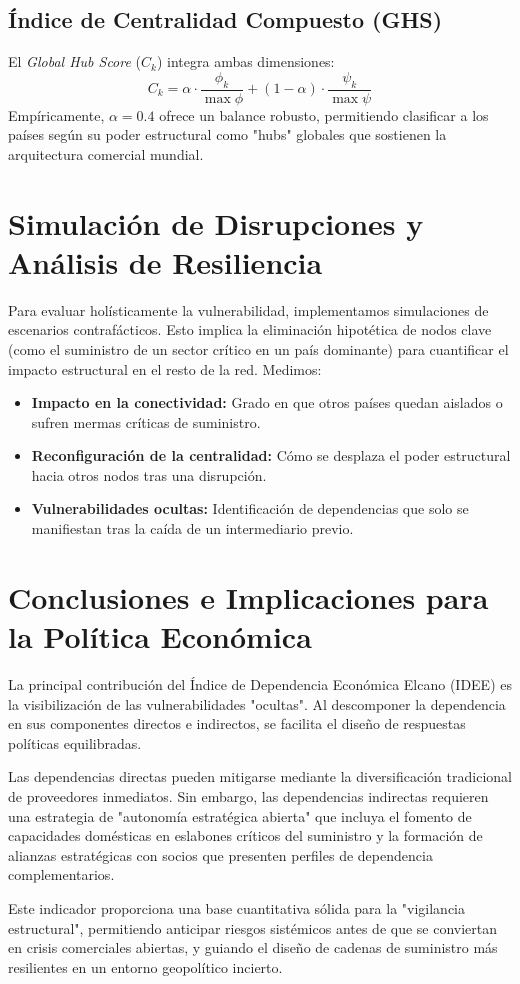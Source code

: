 \documentclass[final,1p,times,authoryear]{elsarticle}
\begin{document}
\subsection{Índice de Centralidad Compuesto (GHS)}
El \textit{Global Hub Score} ($C_k$) integra ambas dimensiones:
\begin{equation}
C_k = \alpha \cdot \frac{\phi_k}{\max \phi} + (1-\alpha) \cdot \frac{\psi_k}{\max \psi}
\end{equation}
Empíricamente, $\alpha = 0.4$ ofrece un balance robusto, permitiendo clasificar a los países según su poder estructural como "hubs" globales que sostienen la arquitectura comercial mundial.

\section{Simulación de Disrupciones y Análisis de Resiliencia}



Para evaluar holísticamente la vulnerabilidad, implementamos simulaciones de escenarios contrafácticos. Esto implica la eliminación hipotética de nodos clave (como el suministro de un sector crítico en un país dominante) para cuantificar el impacto estructural en el resto de la red. Medimos:
\begin{itemize}
    \item \textbf{Impacto en la conectividad:} Grado en que otros países quedan aislados o sufren mermas críticas de suministro.
    \item \textbf{Reconfiguración de la centralidad:} Cómo se desplaza el poder estructural hacia otros nodos tras una disrupción.
    \item \textbf{Vulnerabilidades ocultas:} Identificación de dependencias que solo se manifiestan tras la caída de un intermediario previo.
\end{itemize}

\section{Conclusiones e Implicaciones para la Política Económica}

La principal contribución del Índice de Dependencia Económica Elcano (IDEE) es la visibilización de las vulnerabilidades "ocultas". Al descomponer la dependencia en sus componentes directos e indirectos, se facilita el diseño de respuestas políticas equilibradas.

Las dependencias directas pueden mitigarse mediante la diversificación tradicional de proveedores inmediatos. Sin embargo, las dependencias indirectas requieren una estrategia de "autonomía estratégica abierta" que incluya el fomento de capacidades domésticas en eslabones críticos del suministro y la formación de alianzas estratégicas con socios que presenten perfiles de dependencia complementarios.

Este indicador proporciona una base cuantitativa sólida para la "vigilancia estructural", permitiendo anticipar riesgos sistémicos antes de que se conviertan en crisis comerciales abiertas, y guiando el diseño de cadenas de suministro más resilientes en un entorno geopolítico incierto.



\end{document}
